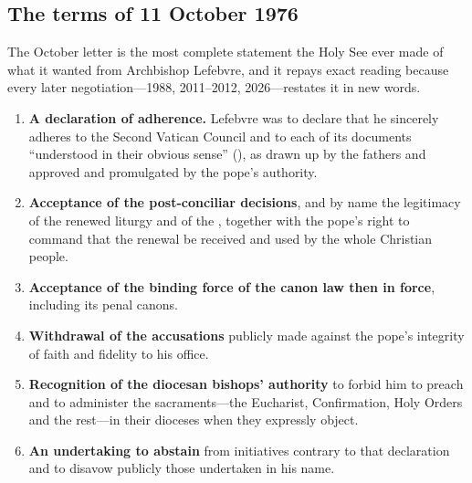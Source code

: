 \subsection{The terms of 11 October 1976}

The October letter is the most complete statement the Holy See ever made
of what it wanted from Archbishop Lefebvre, and it repays exact reading
because every later negotiation---1988, 2011--2012, 2026---restates it in
new words.

\begin{enumerate}
\item \textbf{A declaration of adherence.} Lefebvre was to declare that
he sincerely adheres to the Second Vatican Council and to each of its
documents ``understood in their obvious sense'' (), as
drawn up by the fathers and approved and promulgated by the pope's
authority.
\item \textbf{Acceptance of the post-conciliar decisions}, and by name
the legitimacy of the renewed liturgy and of the ,
together with the pope's right to command that the renewal be received
and used by the whole Christian people.
\item \textbf{Acceptance of the binding force of the canon law then in
force}, including its penal canons.
\item \textbf{Withdrawal of the accusations} publicly made against the
pope's integrity of faith and fidelity to his office.
\item \textbf{Recognition of the diocesan bishops' authority} to forbid
him to preach and to administer the sacraments---the Eucharist,
Confirmation, Holy Orders and the rest---in their dioceses when they
expressly object.
\item \textbf{An undertaking to abstain} from initiatives contrary to
that declaration and to disavow publicly those undertaken in his
name.
\end{enumerate}

